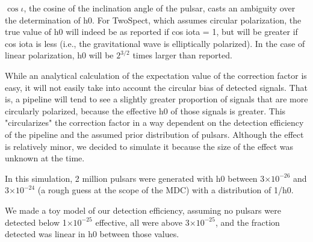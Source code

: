 $\cos \iota$, the cosine of the inclination angle of the pulsar, casts an ambiguity over the determination of h0. For TwoSpect, which assumes circular polarization, the true value of h0 will indeed be as reported if cos iota = 1, but will be greater if cos iota is less (i.e., the gravitational wave is elliptically polarized). In the case of linear polarization, h0 will be $2^{3/2}$ times larger than reported.

While an analytical calculation of the expectation value of the correction factor is easy, it will not easily take into account the circular bias of detected signals. That is, a pipeline will tend to see a slightly greater proportion of signals that are more circularly polarized, because the effective h0 of those signals is greater. This "circularizes" the correction factor in a way dependent on the detection efficiency of the pipeline and the assumed prior distribution of pulsars. Although the effect is relatively minor, we decided to simulate it because the size of the effect was unknown at the time.

In this simulation, 2 million pulsars were generated with h0 between 3$\times 10^{-26}$ and 3$\times 10^{-24}$ (a rough guess at the scope of the MDC) with a distribution of 1/h0.

We made a toy model of our detection efficiency, assuming no pulsars were detected below 1$\times 10^{-25}$ effective, all were above 3$\times 10^{-25}$, and the fraction detected was linear in h0 between those values.

